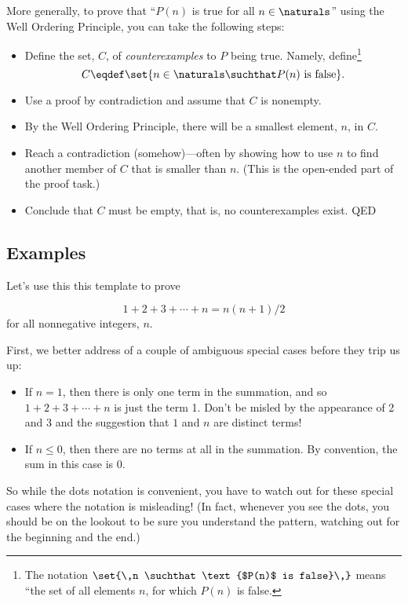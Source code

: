 More generally, to prove that ``$P(n)$ is true for all
$n\in \naturals$'' using the Well Ordering Principle, you can take the
following steps:
\begin{itemize}

\item Define the set, $C$, of \emph{counterexamples} to $P$ being
  true.  Namely, define\footnote{The notation
    $\set{\,n \suchthat \text{$P(n)$ is false}\,}$
    means ``the set of all elements $n$, for which $P(n)$ is false.}
\[
C \eqdef \set{n\in\naturals \suchthat P(n) \text{ is false}}.
\]

\item Use a proof by contradiction and assume that $C$ is nonempty.

\item By the Well Ordering Principle, there will be a smallest
      element, $n$, in $C$.

\item Reach a contradiction (somehow)---often by showing how to use $n$
to find another member of $C$ that is smaller than $n$.  (This is the
open-ended part of the proof task.)

\item Conclude that $C$ must be empty, that is, no counterexamples exist.
QED

\end{itemize}


\subsection{Examples}

Let's use this this template to prove %

\begin{theorem*}  %
\begin{equation}\label{sum1n}
1 + 2 + 3 + \cdots + n = n(n+1)/2
\end{equation}
for all nonnegative integers, $n$.
\end{theorem*}

First, we better address of a couple of ambiguous special
cases before they trip us up:
%
\begin{itemize}
%
\item If $n = 1$, then there is only one term in the summation, and so $1
  + 2 + 3 + \cdots + n$ is just the term 1.  Don't be misled by the
  appearance of 2 and 3 and the suggestion that $1$ and $n$ are distinct
  terms!
%
\item If $n \leq 0$, then there are no terms at all in the summation.  By
convention, the sum in this case is 0.
%
\end{itemize}
%
So while the dots notation is convenient, you have to watch out for these
special cases where the notation is misleading!  (In fact, whenever you
see the dots, you should be on the lookout to be sure you understand the
pattern, watching out for the beginning and the end.)

